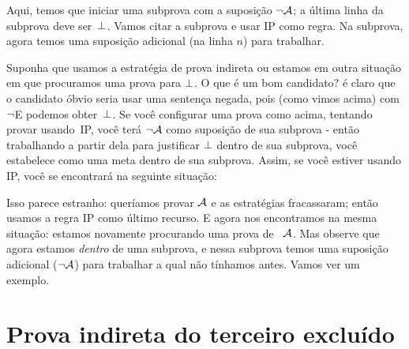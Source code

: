 \begin{fitchproof}
\open
{}
\ellipsesline 
{}
\close
{}
\end{fitchproof}
Aqui, temos que iniciar uma subprova com a suposi\c c\~ao $\neg \mathcal{A}$;
a \'ultima linha da subprova deve ser~$\bot$. Vamos citar a subprova e usar  IP como regra. Na subprova, agora temos uma suposi\c c\~ao adicional (na linha $n$) para trabalhar.

Suponha que usamos a estrat\'egia de prova indireta ou estamos em outra situa\c c\~ao em que procuramos uma prova para  $\bot$.   O que \'e um bom candidato? \'e claro que o candidato \'obvio seria usar uma senten\c ca negada, pois (como vimos acima) com $\neg$E podemos obter~$\bot$. 
 Se voc\^e configurar uma prova como acima, tentando provar  usando~IP, voc\^e ter\'a $\neg \mathcal{A}$ como suposi\c c\~ao de sua subprova - ent\~ao trabalhando a partir dela para justificar $\bot$ dentro de sua subprova, voc\^e estabelece  como uma meta dentro de sua subprova. Assim, se voc\^e estiver usando  IP, voc\^e se encontrar\'a na seguinte situa\c c\~ao:
\begin{fitchproof}
\open
{}
\ellipsesline
{}
\close
{}
\end{fitchproof} 


Isso parece estranho: quer\'iamos provar $\mathcal{A}$ e as estrat\'egias fracassaram; ent\~ao usamos a regra  IP como \'ultimo recurso. E agora nos encontramos na mesma situa\c c\~ao: estamos novamente procurando uma prova de ~$\mathcal{A}$. Mas observe que agora estamos \emph{dentro} de uma subprova, e nessa subprova temos uma suposi\c c\~ao adicional ($\neg \mathcal{A}$) para trabalhar a qual n\~ao t\'inhamos antes. Vamos ver um exemplo.


\section{Prova indireta do terceiro exclu\'ido}\label{s:proofLEM}

